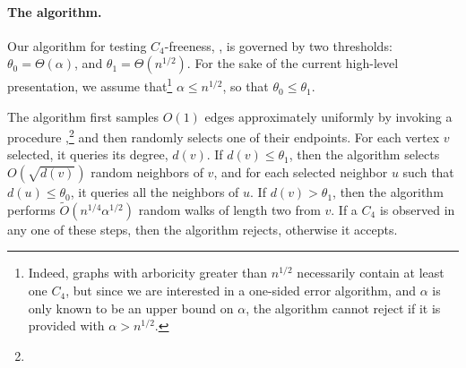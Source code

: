 \paragraph{The algorithm.}
Our algorithm for testing $C_4$-freeness,  \TestCfour,   
is governed by two thresholds: $\theta_0=\Theta(\alpha)$, and $\theta_1=\Theta(n^{1/2})$. 
For the sake of the current high-level presentation, 
we 
assume that\footnote{Indeed, graphs with arboricity greater than $n^{1/2}$ necessarily contain at least one $C_4$, but since we are interested in a one-sided error algorithm, and $\alpha$ is only known to be an upper bound on $\alpha$, the algorithm cannot reject if it is provided with $\alpha > n^{1/2}$.} $\alpha \leq n^{1/2}$, 
so that $\theta_0\leq \theta_1$.

The algorithm first samples $O(1)$ edges approximately uniformly by invoking a procedure
\SelectEdge,\footnote{}
and then randomly selects one of their endpoints. For each vertex $v$ selected, it queries its degree, $d(v)$. If $d(v)\leq \theta_1$, then the algorithm selects $O(\sqrt{d(v)})$ random neighbors of $v$, and for each selected neighbor $u$ such that $d(u)\leq \theta_0$,  it queries all the neighbors of $u$. If $d(v)>\theta_1$, then the algorithm
performs $\widetilde{O}(n^{1/4}\alpha^{1/2})$ random walks of length two from $v$. If a $C_4$ is observed in any one of these steps, then the algorithm rejects, otherwise it accepts.

